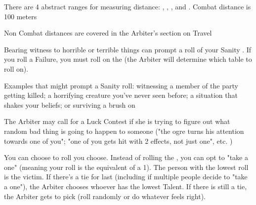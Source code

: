 {\cbreak


There are 4 abstract ranges for measuring distance:  , , , and  .  \MAX Combat distance is 100 meters




Non Combat distances are covered in the Arbiter's section on Travel





Bearing witness to horrible or terrible things can prompt a roll of your Sanity \UD.  If you roll a Failure, you must roll on the  (the Arbiter will determine which table to roll on). 

Examples that might prompt a Sanity roll:  witnessing a member of the party getting killed; a horrifying creature you've never seen before; a situation that shakes your beliefs; or surviving a brush on 



The Arbiter may call for a Luck Contest if she is trying to figure out what random bad thing is going to happen to someone ("the ogre turns his attention towards one of you"; "one of you gets hit with 2 effects, not just one", etc. )

You can choose to roll   \UD you choose.  Instead of rolling the \UD, you can opt to "take a one" (meaning your roll is the equivalent of a 1).  The person with the lowest roll is the victim. If there's a tie for last (including if multiple people decide to "take a one"), the Arbiter chooses whoever has the lowest Talent.  If there is still a tie, the Arbiter gets to pick (roll randomly or do whatever feels right).

\newpage

}